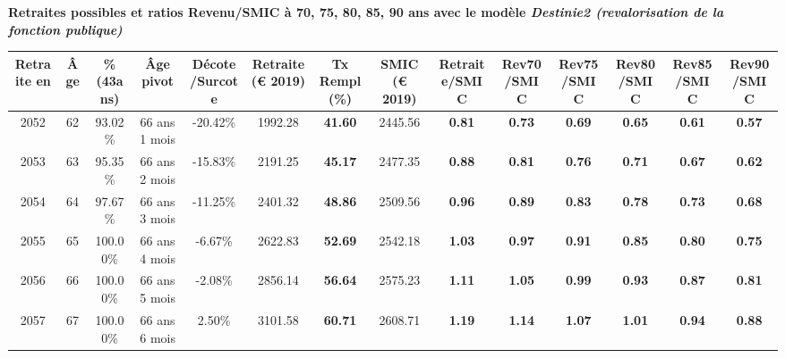  \vspace{0.1cm} 
{\bf \noindent Retraites possibles et ratios Revenu/SMIC à 70, 75, 80, 85, 90 ans avec le modèle \emph{Destinie2 (revalorisation de la fonction publique)}}  
 
\begin{adjustbox}{max width=\textwidth} 
\begin{tabular}[htb]{|c|c||c|c|c||c|c||c||c|c|c|c|c|c|} 
\hline 
 Retraite en &  Âge &  \%(43ans) &  Âge pivot &  Décote/Surcote &  Retraite (\euro{} 2019) &  Tx Rempl(\%) &  SMIC (\euro{} 2019) &  Retraite/SMIC &  Rev70/SMIC &  Rev75/SMIC &  Rev80/SMIC &  Rev85/SMIC &  Rev90/SMIC \\ 
\hline \hline 
 2052 &  62 &  93.02\% &  66 ans 1 mois &  -20.42\% &  1992.28 &  {\bf 41.60} &  2445.56 &  {\bf {\color{red} 0.81}} &  {\bf {\color{red} 0.73}} &  {\bf {\color{red} 0.69}} &  {\bf {\color{red} 0.65}} &  {\bf {\color{red} 0.61}} &  {\bf {\color{red} 0.57}} \\ 
\hline 
 2053 &  63 &  95.35\% &  66 ans 2 mois &  -15.83\% &  2191.25 &  {\bf 45.17} &  2477.35 &  {\bf {\color{red} 0.88}} &  {\bf {\color{red} 0.81}} &  {\bf {\color{red} 0.76}} &  {\bf {\color{red} 0.71}} &  {\bf {\color{red} 0.67}} &  {\bf {\color{red} 0.62}} \\ 
\hline 
 2054 &  64 &  97.67\% &  66 ans 3 mois &  -11.25\% &  2401.32 &  {\bf 48.86} &  2509.56 &  {\bf {\color{red} 0.96}} &  {\bf {\color{red} 0.89}} &  {\bf {\color{red} 0.83}} &  {\bf {\color{red} 0.78}} &  {\bf {\color{red} 0.73}} &  {\bf {\color{red} 0.68}} \\ 
\hline 
 2055 &  65 &  100.00\% &  66 ans 4 mois &  -6.67\% &  2622.83 &  {\bf 52.69} &  2542.18 &  {\bf 1.03} &  {\bf {\color{red} 0.97}} &  {\bf {\color{red} 0.91}} &  {\bf {\color{red} 0.85}} &  {\bf {\color{red} 0.80}} &  {\bf {\color{red} 0.75}} \\ 
\hline 
 2056 &  66 &  100.00\% &  66 ans 5 mois &  -2.08\% &  2856.14 &  {\bf 56.64} &  2575.23 &  {\bf 1.11} &  {\bf 1.05} &  {\bf {\color{red} 0.99}} &  {\bf {\color{red} 0.93}} &  {\bf {\color{red} 0.87}} &  {\bf {\color{red} 0.81}} \\ 
\hline 
 2057 &  67 &  100.00\% &  66 ans 6 mois &  2.50\% &  3101.58 &  {\bf 60.71} &  2608.71 &  {\bf 1.19} &  {\bf 1.14} &  {\bf 1.07} &  {\bf 1.01} &  {\bf {\color{red} 0.94}} &  {\bf {\color{red} 0.88}} \\ 
\hline 
\hline 
\end{tabular} 
\end{adjustbox} 
 
